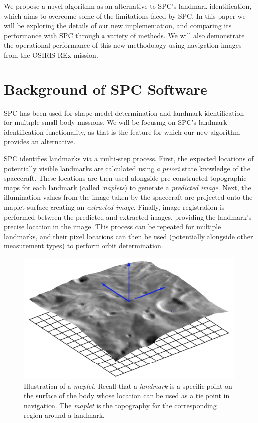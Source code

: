 \documentclass{RPI-SIW}
\begin{document}
We propose a novel algorithm as an alternative to SPC's landmark identification, which aims to overcome some of the limitations faced by SPC.  In this paper we will be exploring the details of our new implementation, and comparing its performance with SPC through a variety of methods.  We will also demonstrate the operational performance of this new methodology using navigation images from the OSIRIS-REx mission.

\section*{Background of SPC Software}
SPC has been used for shape model determination and landmark identification for multiple small body missions.\cite{gaskell_nav_overview}  We will be focusing on SPC's landmark identification functionality, as that is the feature for which our new algorithm provides an alternative.

SPC identifies landmarks via a multi-step process.  First, the expected locations of potentially visible landmarks are calculated using \textit{a priori} state knowledge of the spacecraft.  These locations are then used alongside pre-constructed topographic maps for each landmark (called \textit{maplets}) to generate a \textit{predicted image}.  Next, the illumination values from the image taken by the spacecraft are projected onto the maplet surface creating an \textit{extracted image}.  Finally, image registration is performed between the predicted and extracted images, providing the landmark's precise location in the image.  This process can be repeated for multiple landmarks, and their pixel locations can then be used (potentially alongside other measurement types) to perform orbit determination.

\begin{figure}[h]
	\centering
	\includegraphics[width=\columnwidth]{spc_maplet.png}
	\caption{Illustration of a \textit{maplet}.  Recall that a \textit{landmark} is a specific point on the surface of the body whose location can be used as a tie point in navigation.  The \textit{maplet} is the topography for the corresponding region around a landmark.}
	\label{figs::maplet}
\end{figure}
\end{document}
